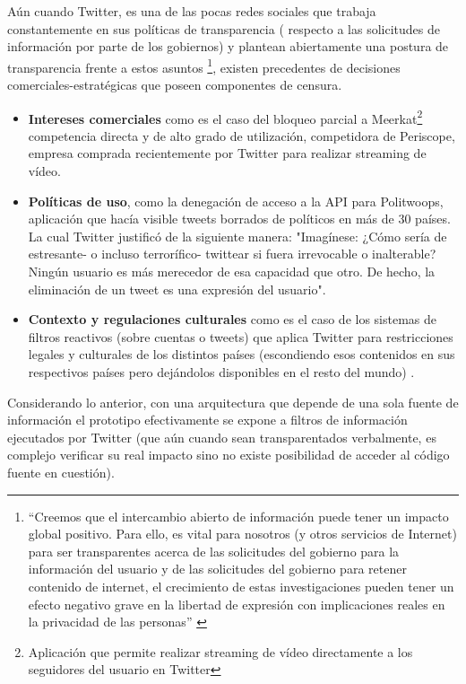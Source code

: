 Aún cuando Twitter, es una de las pocas redes sociales que trabaja constantemente en sus políticas de transparencia ( respecto a las solicitudes de información por parte de los gobiernos)  y plantean abiertamente una postura de transparencia frente a estos asuntos \footnote{``Creemos que el intercambio abierto de información puede tener un impacto global positivo. Para ello, es vital para nosotros (y otros servicios de Internet) para ser transparentes acerca de las solicitudes del gobierno para la información del usuario y de las solicitudes del gobierno para retener contenido de internet, el crecimiento de estas investigaciones pueden tener un efecto negativo grave en la libertad de expresión con implicaciones reales en la privacidad de las personas'' \cite{tweetsStillMustFlow} }, existen precedentes de decisiones comerciales-estratégicas que poseen componentes de censura.

\begin{itemize}
	\item \textbf{Intereses comerciales} como es el caso del bloqueo parcial a 
	Meerkat\footnote{Aplicación que permite realizar streaming de vídeo directamente a los seguidores del usuario en Twitter} competencia directa y de alto grado de utilización, competidora de Periscope, empresa comprada recientemente por Twitter para realizar streaming de vídeo. 
	\item \textbf{Políticas de uso}, como la denegación de acceso a la API para 
	Politwoops\cite{Diplotwoops:Online}, aplicación que hacía visible tweets borrados de políticos en más de 30 países. La cual Twitter justificó de la siguiente manera: "Imagínese: ¿Cómo sería de estresante- o incluso terrorífico-  twittear si fuera irrevocable o inalterable? Ningún usuario es más merecedor de esa capacidad que otro. De hecho, la eliminación de un tweet es una expresión del usuario".
	\item \textbf{Contexto y regulaciones culturales} como es el caso de los sistemas de filtros reactivos (sobre cuentas o tweets) que aplica Twitter para restricciones legales y culturales de los distintos países (escondiendo esos contenidos en sus respectivos países pero dejándolos disponibles en el resto del mundo) \cite{tweetsStillMustFlow}.
\end{itemize}

Considerando lo anterior, con una arquitectura que depende de una sola fuente de información el prototipo efectivamente se expone a filtros de información ejecutados por Twitter (que aún cuando sean transparentados verbalmente, es complejo verificar su real impacto sino no existe posibilidad de acceder al código fuente en cuestión). 

